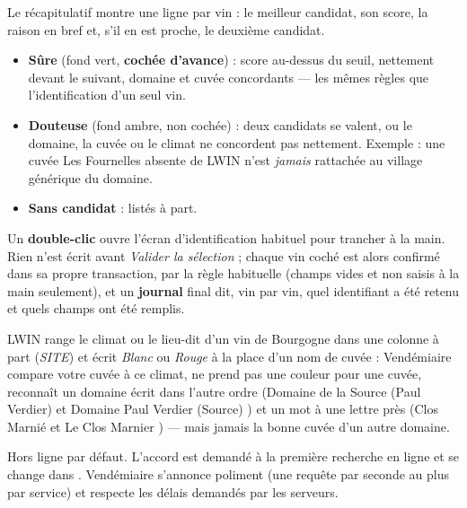 \documentclass[11pt,a4paper]{article}
\begin{document}
Le récapitulatif montre une ligne par vin : le meilleur candidat, son score, la raison en bref et, s'il
en est proche, le deuxième candidat.
\begin{itemize}
  \item \textbf{Sûre} (fond vert, \textbf{cochée d'avance}) : score au-dessus du seuil, nettement devant
        le suivant, domaine et cuvée concordants --- les mêmes règles que l'identification d'un seul vin.
  \item \textbf{Douteuse} (fond ambre, non cochée) : deux candidats se valent, ou le domaine, la cuvée ou
        le climat ne concordent pas nettement. Exemple : une cuvée \og Les Fournelles \fg{} absente de
        LWIN n'est \emph{jamais} rattachée au village générique du domaine.
  \item \textbf{Sans candidat} : listés à part.
\end{itemize}
Un \textbf{double-clic} ouvre l'écran d'identification habituel pour trancher à la main. Rien n'est écrit
avant \emph{Valider la sélection} ; chaque vin coché est alors confirmé dans sa propre transaction, par la
règle habituelle (champs vides et non saisis à la main seulement), et un \textbf{journal} final dit, vin
par vin, quel identifiant a été retenu et quels champs ont été remplis.


\begin{astuce}
LWIN range le climat ou le lieu-dit d'un vin de Bourgogne dans une colonne à part (\emph{SITE}) et
écrit \emph{Blanc} ou \emph{Rouge} à la place d'un nom de cuvée : Vendémiaire compare votre cuvée à ce
climat, ne prend pas une couleur pour une cuvée, reconnaît un domaine écrit dans l'autre ordre
(\og Domaine de la Source (Paul Verdier) \fg{} et \og Domaine Paul Verdier (Source) \fg{}) et un mot à une
lettre près (\og Clos Marnié \fg{} et \og Le Clos Marnier \fg{}) --- mais jamais la bonne cuvée d'un autre
domaine.
\end{astuce}

\begin{astuce}
Hors ligne par défaut. L'accord est demandé à la première recherche en ligne et se change dans
. Vendémiaire s'annonce poliment (une requête par
seconde au plus par service) et respecte les délais demandés par les serveurs.
\end{astuce}
\end{document}
